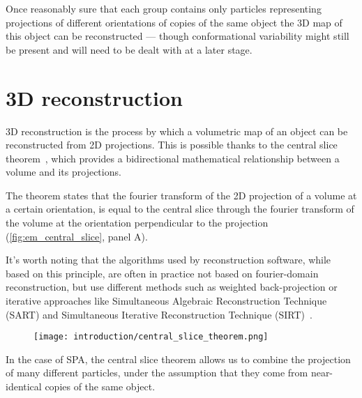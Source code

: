 Once reasonably sure that each group contains only particles representing projections of different orientations of copies of the same object the 3D map of this object can be reconstructed --- though conformational variability might still be present and will need to be dealt with at a later stage.

\section{3D reconstruction}\label{em_reconstruction}

3D reconstruction is the process by which a volumetric map of an object can be reconstructed from 2D projections.
This is possible thanks to the central slice theorem~\cite{wikipediaProjectionsliceTheorem2023}, which provides a bidirectional mathematical relationship between a volume and its projections.

The theorem states that the fourier transform of the 2D projection of a volume at a certain orientation, is equal to the central slice through the fourier transform of the volume at the orientation perpendicular to the projection (\autoref{fig:em_central_slice}, panel A).

It's worth noting that the algorithms used by reconstruction software, while based on this principle, are often in practice not based on fourier-domain reconstruction, but use different methods such as weighted back-projection or iterative approaches like Simultaneous Algebraic Reconstruction Technique (SART) and Simultaneous Iterative Reconstruction Technique (SIRT)~\cite{andersenSimultaneousAlgebraicReconstruction1984,agulleiroFastTomographicReconstruction2011,wikipediaTomographicReconstruction2024}.

\begin{figure}[ht]
    \centering
    \texttt{[image: introduction/central\_slice\_theorem.png]}
    \label{fig:em_central_slice}
\end{figure}

In the case of SPA, the central slice theorem allows us to combine the projection of many different particles, under the assumption that they come from near-identical copies of the same object.

